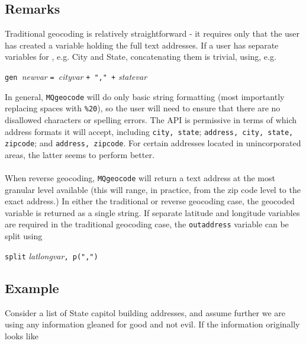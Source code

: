 \documentclass[12pt]{article}
\begin{document}
\subsection{Remarks}
Traditional geocoding is relatively straightforward - it requires only that the user has created a variable holding the full text addresses. If a user has separate variables for , e.g. City and State, concatenating them is trivial, using, e.g.

 \begin{center}\verb|gen |\textit{newvar} \verb|= |\textit{cityvar} \verb|+ "," +| \textit{statevar} \end{center} 
In general, \verb|MQgeocode| will do only basic string formatting (most importantly replacing spaces with \verb|%20|), so the user will need to ensure that there are no disallowed characters or spelling errors. The API is permissive in terms of which address formats it will accept, including \verb|city, state|; \verb|address, city, state, zipcode|; and \verb|address, zipcode|. For certain addresses located in unincorporated areas, the latter seems to perform better. 
\\ \\
When reverse geocoding, \verb|MQgeocode| will return a text address at the most granular level available (this will range, in practice, from the zip code level to the exact address.) In either the traditional or reverse geocoding case, the geocoded variable is returned as a single string. If separate latitude and longitude variables are required in the traditional geocoding case, the \verb|outaddress| variable can be split using

\begin{center}
\verb|split| \textit{latlongvar}\verb|, p(",")|
\end{center}

\subsection{Example}
Consider a list of State capitol building addresses, and assume further we are using any information gleaned for good and not evil. If the information originally looks like
\end{document}
